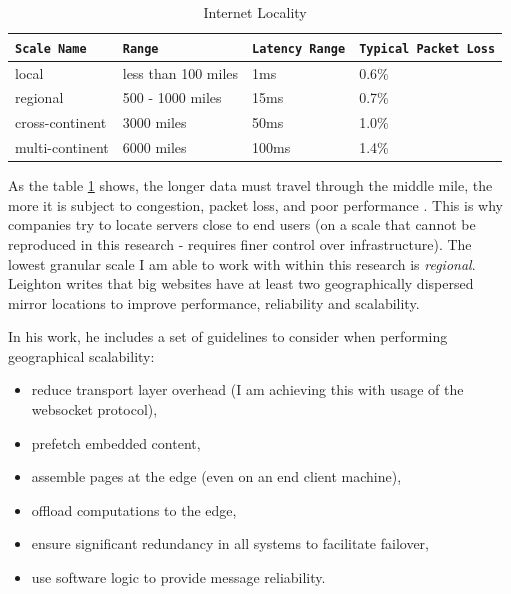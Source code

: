 \documentclass{uvamscse}
\begin{document}
\begin{table}[h]
\begin{center}
\begin{tabular}{llll}
  \texttt{Scale Name}       & \texttt{Range}        & \texttt{Latency Range}  & \texttt{Typical Packet Loss}\\
  \hline
  local                     & less than 100 miles   & 1ms                     & 0.6\% \\
  regional                  & 500 - 1000 miles      & 15ms                    & 0.7\% \\
  cross-continent           & 3000 miles            & 50ms                    & 1.0\% \\
  multi-continent           & 6000 miles            & 100ms                   & 1.4\% \\
\end{tabular}
\end{center}
\caption{Internet Locality}
\label{table:internetLocality}
\end{table}
As the table \ref{table:internetLocality} shows, the longer data must travel through the middle mile, the more it is subject to congestion, packet loss, and poor performance \cite{Akamai}. This is why companies try to locate servers close to end users (on a scale that cannot be reproduced in this research - requires finer control over infrastructure). The lowest granular scale I am able to work with within this research is \textit{regional}. Leighton writes that big websites have at least two geographically dispersed mirror locations to improve performance, reliability and scalability.

In his work, he includes a set of guidelines to consider when performing geographical scalability:
\begin{itemize}
  \item reduce transport layer overhead (I am achieving this with usage of the websocket protocol),
  \item prefetch embedded content,
  \item assemble pages at the edge (even on an end client machine),
  \item offload computations to the edge,
  \item ensure significant redundancy in all systems to facilitate failover,
  \item use software logic to provide message reliability.
\end{itemize}
\end{document}
